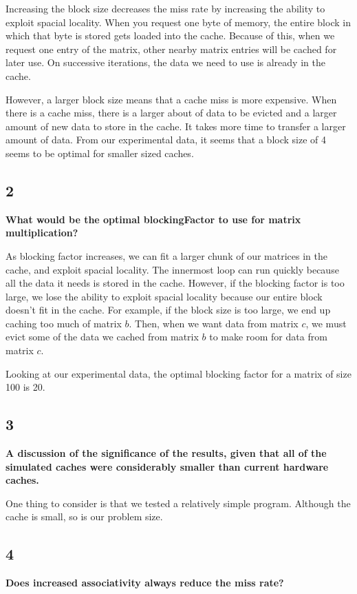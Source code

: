 \documentclass[letterpaper, 12pt, oneside]{memoir}
\begin{document}
Increasing the block size decreases the miss rate by increasing the ability to
exploit spacial locality. When you request one byte of memory, the
entire block in which that byte is stored gets loaded into the cache. Because 
of this, when we request one entry of the matrix, other nearby matrix entries
will be cached for later use. On successive iterations, the data we need to use
is already in the cache.

However, a larger block size means that a cache miss is more expensive. When
there is a cache miss, there is a larger about of data to be evicted and a
larger amount of new data to store in the cache. It takes more time to transfer
a larger amount of data. From our experimental data, it seems that a block size
of 4 seems to be optimal for smaller sized caches.


\subsection{2}
\textbf{What would be the optimal blockingFactor to use for matrix
multiplication?}

As blocking factor increases, we can fit a larger chunk of our matrices in the
cache, and exploit spacial locality. The innermost loop can run quickly because
all the data it needs is stored in the cache. However, if the blocking factor
is too large, we lose the ability to exploit spacial locality because our entire
block doesn't fit in the cache. For example, if the block size is too
large, we end up caching too much of matrix $b$. Then, when we want data from
matrix $c$, we must evict some of the data we cached from matrix $b$ to make
room for data from matrix $c$.

Looking at our experimental data, the optimal blocking factor for a matrix
of size 100 is 20.


\subsection{3}
\textbf{A discussion of the significance of the results, given that all of the
simulated caches were considerably smaller than current hardware caches.}

One thing to consider is that we tested a relatively simple program. Although
the cache is small, so is our problem size. 

\subsection{4}
\textbf{Does increased associativity always reduce the miss rate?}
\end{document}
